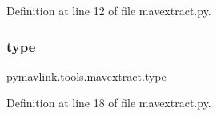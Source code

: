 Definition at line 12 of file mavextract.\+py.

\mbox{\label{namespacepymavlink_1_1tools_1_1mavextract_a66a2ee63fed8b11066152eb667c63220}} 
\subsubsection{\texorpdfstring{type}{type}}
{\footnotesize\ttfamily pymavlink.\+tools.\+mavextract.\+type}



Definition at line 18 of file mavextract.\+py.

